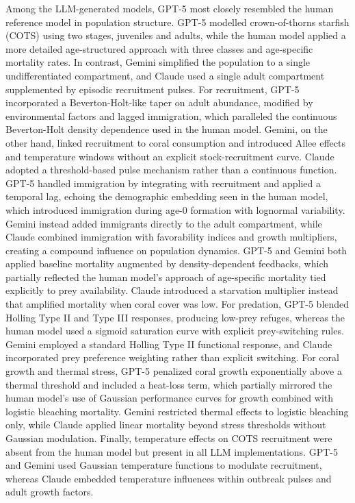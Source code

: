 Among the LLM-generated models, GPT-5 most closely resembled the human reference model in population structure. GPT-5 modelled crown-of-thorns starfish (COTS) using two stages, juveniles and adults, while the human model applied a more detailed age-structured approach with three classes and age-specific mortality rates. In contrast, Gemini simplified the population to a single undifferentiated compartment, and Claude used a single adult compartment supplemented by episodic recruitment pulses. For recruitment, GPT-5 incorporated a Beverton-Holt-like taper on adult abundance, modified by environmental factors and lagged immigration, which paralleled the continuous Beverton-Holt density dependence used in the human model. Gemini, on the other hand, linked recruitment to coral consumption and introduced Allee effects and temperature windows without an explicit stock-recruitment curve. Claude adopted a threshold-based pulse mechanism rather than a continuous function. GPT-5 handled immigration by integrating with recruitment and applied a temporal lag, echoing the demographic embedding seen in the human model, which introduced immigration during age-0 formation with lognormal variability. Gemini instead added immigrants directly to the adult compartment, while Claude combined immigration with favorability indices and growth multipliers, creating a compound influence on population dynamics. GPT-5 and Gemini both applied baseline mortality augmented by density-dependent feedbacks, which partially reflected the human model's approach of age-specific mortality tied explicitly to prey availability. Claude introduced a starvation multiplier instead that amplified mortality when coral cover was low. For predation, GPT-5 blended Holling Type II and Type III responses, producing low-prey refuges, whereas the human model used a sigmoid saturation curve with explicit prey-switching rules. Gemini employed a standard Holling Type II functional response, and Claude incorporated prey preference weighting rather than explicit switching.
For coral growth and thermal stress, GPT-5 penalized coral growth exponentially above a thermal threshold and included a heat-loss term, which partially mirrored the human model's use of Gaussian performance curves for growth combined with logistic bleaching mortality. Gemini restricted thermal effects to logistic bleaching only, while Claude applied linear mortality beyond stress thresholds without Gaussian modulation. Finally,
temperature effects on COTS recruitment were absent from the human model but present in all LLM implementations. GPT-5 and Gemini used Gaussian temperature functions to modulate recruitment, whereas Claude embedded temperature influences within outbreak pulses and adult growth factors.

